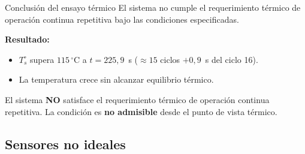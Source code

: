 \documentclass[aspectratio=169,t]{beamer}
\begin{document}
\begin{frame}{Conclusión del ensayo térmico}
{\small\color{uncGray}El sistema no cumple el requerimiento térmico de operación continua repetitiva bajo las condiciones especificadas.}\par
\vspace{8mm}

\textbf{Resultado:}
\begin{itemize}
\item $T_s^\circ$ supera $115\,^\circ$C a $t = 225{,}9$~s ($\approx 15$ ciclos $+ 0{,}9$~s del ciclo 16).
\item La temperatura crece sin alcanzar equilibrio térmico.
\end{itemize}

\vspace{4mm}
El sistema \textbf{NO} satisface el requerimiento térmico de operación continua repetitiva. La condición es \textbf{no admisible} desde el punto de vista térmico.

\end{frame}


\subsection{Sensores no ideales}
\end{document}
